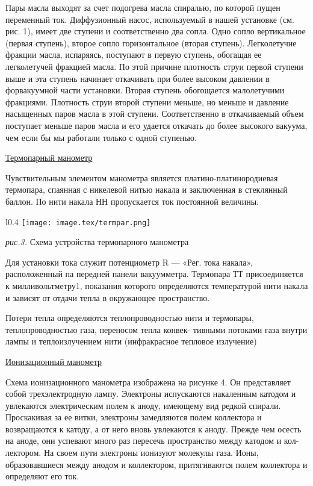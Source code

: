 \documentclass{article}
\begin{document}
Пары масла выходят за счет подогрева масла спиралью, по которой пущен переменный ток. Диффузионный насос, используемый в нашей установке (см. рис. 1), имеет две ступени и соответственно два сопла. Одно сопло вертикальное (первая ступень), второе сопло горизонтальное (вторая ступень). Легколетучие фракции масла, испаряясь, поступают в первую ступень, обогащая ее легколетучей фракцией масла. По этой причине плотность струи первой ступени выше и эта ступень начинает откачивать при более высоком давлении в форвакуумной части установки. Вторая ступень обогощается малолетучими фракциями. Плотность струи второй ступени меньше, но меньше и давление насыщенных паров масла в этой ступени. Соответственно в откачиваемый объем поступает меньше паров масла и его удается откачать до более высокого вакуума, чем если бы мы работали только с одной ступенью.

\underline {Термопарный манометр}

Чувствительным элементом манометра является платино-платинородиевая термопара, спаянная с никелевой нитью накала и заключенная в стеклянный баллон. По нити накала НН пропускается ток постоянной величины.

\begin{wrapfigure}{l}{0.4\textwidth}
    \centering
    \texttt{[image: image.tex/termpar.png]}

    \textit{рис.3.} Схема устройства термопарного манометра
\end{wrapfigure}

Для установки тока служит потенциометр R — «Рег. тока накала», расположенный па передней панели вакуумметра. Термопара ТТ присоединяется к милливольтметру1, показания которого определяются температурой нити накала и зависят от отдачи тепла в окружающее пространство.

Потери тепла определяются теплопроводностью нити и термопары, теплопроводностью газа, переносом тепла конвек- тивными потоками газа внутри лампы и теплоизлучением нити (инфракрасное тепловое излучение)

\underline {Ионизационный манометр}

Схема ионизационного манометра изображена на рисунке 4. Он представляет собой трехэлектродную лампу. Электроны испускаются накаленным катодом и увлекаются электрическим полем к аноду, имеющему вид редкой спирали. Проскакивая за ее витки, электроны замедляются полем коллектора и возвращаются к катоду, а от него вновь увлекаются к аноду. Прежде чем осесть на аноде, они успевают много раз пересечь пространство между катодом и кол- лектором. На своем пути электроны ионизуют молекулы газа. Ионы, образовавшиеся между анодом и коллектором, притягиваются полем коллектора и определяют его ток.
\end{document}
